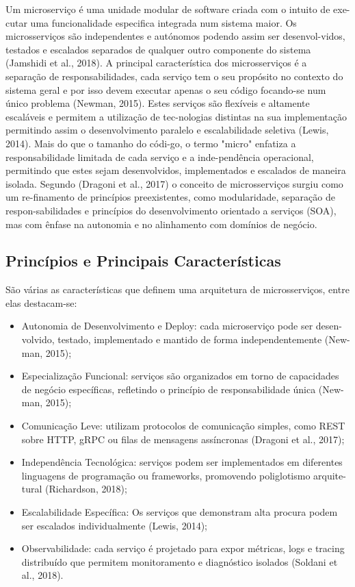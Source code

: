 Um microserviço é uma unidade modular de software criada com o intuito de exe-cutar uma funcionalidade especifica integrada num sistema maior. 
Os microsserviços são independentes e autónomos podendo assim ser desenvol-vidos, testados e escalados separados de qualquer outro componente do sistema (Jamshidi et al., 2018).
A principal característica dos microsserviços é a separação de responsabilidades, cada serviço tem o seu propósito no contexto do sistema geral e por isso devem executar apenas o seu código focando-se num único problema (Newman, 2015). Estes serviços são flexíveis e altamente escaláveis e permitem a utilização de tec-nologias distintas na sua implementação permitindo assim o desenvolvimento paralelo e escalabilidade seletiva (Lewis, 2014). Mais do que o tamanho do códi-go, o termo "micro" enfatiza a responsabilidade limitada de cada serviço e a inde-pendência operacional, permitindo que estes sejam desenvolvidos, implementados e escalados de maneira isolada. 
Segundo (Dragoni et al., 2017) o conceito de microsserviços surgiu como um re-finamento de princípios preexistentes, como modularidade, separação de respon-sabilidades e princípios do desenvolvimento orientado a serviços (SOA), mas com ênfase na autonomia e no alinhamento com domínios de negócio.

\subsection{Princípios e Principais Características}

São várias as características que definem uma arquitetura de microsserviços, entre elas destacam-se:

\begin{itemize}
    \item Autonomia de Desenvolvimento e Deploy: cada microserviço pode ser desen-volvido, testado, implementado e mantido de forma independentemente (New-man, 2015);
    \item Especialização Funcional: serviços são organizados em torno de capacidades de negócio específicas, refletindo o princípio de responsabilidade única (New-man, 2015);
    \item Comunicação Leve: utilizam protocolos de comunicação simples, como REST sobre HTTP, gRPC ou filas de mensagens assíncronas (Dragoni et al., 2017);
    \item Independência Tecnológica: serviços podem ser implementados em diferentes linguagens de programação ou frameworks, promovendo poliglotismo arquite-tural (Richardson, 2018);
    \item Escalabilidade Específica: Os serviços que demonstram alta procura podem ser escalados individualmente (Lewis, 2014);
    \item Observabilidade: cada serviço é projetado para expor métricas, logs e tracing distribuído que permitem monitoramento e diagnóstico isolados (Soldani et al., 2018).
\end{itemize}

